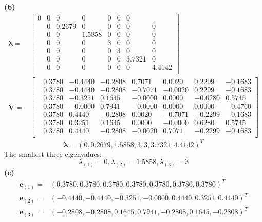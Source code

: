 \documentclass[11pt]{scrartcl}
\begin{document}
\textbf{(b)}\\
\begin{equation*}
\begin{aligned}
\mathbf{\lambda}=&
\begin{bmatrix}
0& 0& 0& 0& 0& 0& 0\\
& 0&0.2679& 0& 0& 0& 0& 0\\
& 0& 0&1.5858& 0& 0& 0& 0\\
& 0& 0& 0&3& 0& 0& 0\\
& 0& 0& 0& 0&3& 0& 0\\
& 0& 0& 0& 0& 0&3.7321& 0\\
& 0& 0& 0& 0& 0& 0&4.4142\\
\end{bmatrix}\\
\mathbf{V}=&
\begin{bmatrix}
& 0.3780&-0.4440&-0.2808& 0.7071& 0.0020& 0.2299&-0.1683\\
& 0.3780&-0.4440&-0.2808&-0.7071&-0.0020& 0.2299&-0.1683\\
& 0.3780&-0.3251& 0.1645&-0.0000& 0.0000&-0.6280& 0.5745\\
& 0.3780&-0.0000& 0.7941&-0.0000& 0.0000& 0.0000&-0.4760\\
& 0.3780& 0.4440&-0.2808& 0.0020&-0.7071&-0.2299&-0.1683\\
& 0.3780& 0.3251& 0.1645& 0.0000&-0.0000& 0.6280& 0.5745\\
& 0.3780& 0.4440&-0.2808&-0.0020& 0.7071&-0.2299&-0.1683\\
\end{bmatrix}
\end{aligned}
\end{equation*}
$$\mathbf{\lambda}=(0,
    0.2679,
    1.5858,
    3,
    3,
    3.7321,
    4.4142)^{T}$$
The smallest three eigenvalues:\\
$$\lambda_{(1)}=0,\lambda_{(2)}=1.5858,\lambda_{(3)}=3$$
\textbf{(c)}
\begin{equation*}
\begin{aligned}
 \mathbf{e}_{(1)}=&  
   (0.3780,
    0.3780,
    0.3780,
    0.3780,
    0.3780,
    0.3780,
    0.3780)^T\\
    \mathbf{e}_{(2)}=&  
  (-0.4440,
   -0.4440,
   -0.3251,
   -0.0000,
    0.4440,
    0.3251,
    0.4440)^T\\
    \mathbf{e}_{(3)}=&  
  (-0.2808,
   -0.2808,
    0.1645,
    0.7941,
   -0.2808,
    0.1645,
   -0.2808)^T\\
\end{aligned}
\end{equation*}
\end{document}
